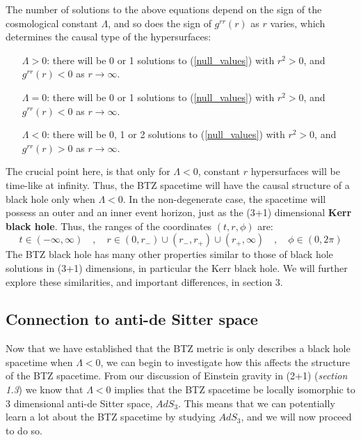 %
%
The number of solutions to the above equations depend on the sign of the cosmological constant $\Lambda$, and so does the sign of $g^{rr}(r)$ as $r$ varies, which determines the causal type of the hypersurfaces:
%
%
\begin{enumerate}
%
\item[$\Lambda > 0$:] there will be 0 or 1 solutions to (\ref{null_values}) with $r^2 > 0$, and $g^{rr}(r) < 0$ as $r \to \infty$.
%
\item[$\Lambda = 0$:] there will be 0 or 1 solutions to (\ref{null_values}) with $r^2 > 0$, and $g^{rr}(r) < 0$ as $r \to \infty$.
%
\item[$\Lambda < 0$:] there will be 0, 1 or 2 solutions to (\ref{null_values}) with $r^2 > 0$, and $g^{rr}(r) > 0$ as $r \to \infty$.
%
\end{enumerate}
%
%
The crucial point here, is that only for $\Lambda < 0$, constant $r$ hypersurfaces will be time-like at infinity. Thus, the BTZ spacetime will have the causal structure of a black hole only when $\Lambda < 0$. In the non-degenerate case, the spacetime will possess an outer and an inner event horizon, just as the (3+1) dimensional \textbf{Kerr black hole}. Thus, the ranges of the coordinates $(t, r, \phi)$ are:
\begin{equation}
t \in (-\infty, \infty)
\quad , \quad
r \in (0, r_-) \cup (r_-, r_+) \cup (r_+, \infty)
\quad , \quad
\phi \in (0, 2 \pi)
\end{equation}
%
%
The BTZ black hole has many other properties similar to those of black hole solutions in (3+1) dimensions, in particular the Kerr black hole. We will further explore these similarities, and important differences, in section 3.

\subsection{Connection to anti-de Sitter space}
Now that we have established that the BTZ metric is only describes a black hole spacetime when $\Lambda < 0$, we can begin to investigate how this affects the structure of the BTZ spacetime. From our discussion of Einstein gravity in (2+1) (\textit{section 1.3}) we know that $\Lambda < 0$ implies that the BTZ spacetime be locally isomorphic to 3 dimensional anti-de Sitter space, $AdS_3$. This means that we can potentially learn a lot about the BTZ spacetime by studying $AdS_3$, and we will now proceed to do so.


